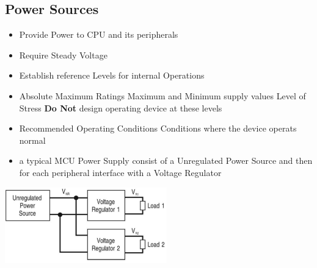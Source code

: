 \subsection{Power Sources }
\begin{minipage}{13cm}
\begin{itemize}
	\item Provide Power to \acs{CPU} and its peripherals
	\item Require Steady Voltage
	\item Establish reference Levels for internal Operations
	\item Absolute Maximum Ratings
    	\subitem Maximum and Minimum supply values
    	\subitem Level of Stress
    	\subitem \textbf{Do Not} design operating device at these levels
	\item Recommended Operating Conditions
    	\subitem Conditions where the device operats normal
	\item a typical \acs{MCU} Power Supply consist of a Unregulated Power Source and then for each peripheral interface with a Voltage Regulator
\end{itemize}
\end{minipage}
\begin{minipage}{5cm}
    \hspace*{-2cm}
    \includegraphics[width=7cm]{images/PowerSource}
\end{minipage}

